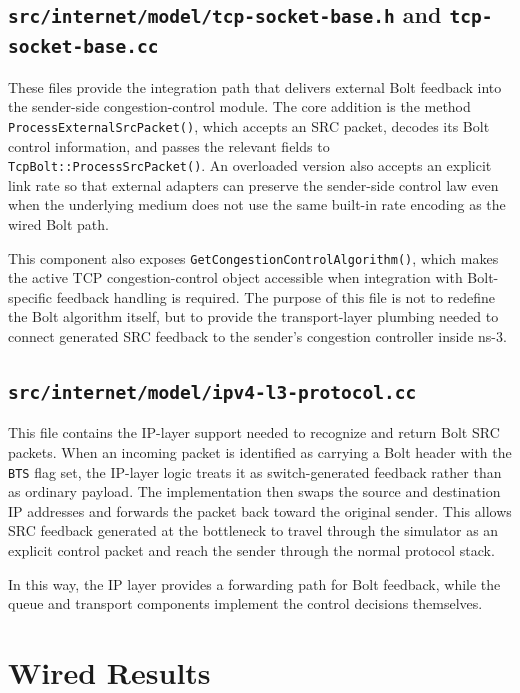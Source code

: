 \subsection{\texttt{src/internet/model/tcp-socket-base.h} and \texttt{tcp-socket-base.cc}}

These files provide the integration path that delivers external Bolt feedback into the sender-side congestion-control module. The core addition is the method \texttt{ProcessExternalSrcPacket()}, which accepts an SRC packet, decodes its Bolt control information, and passes the relevant fields to \texttt{TcpBolt::ProcessSrcPacket()}. An overloaded version also accepts an explicit link rate so that external adapters can preserve the sender-side control law even when the underlying medium does not use the same built-in rate encoding as the wired Bolt path.

This component also exposes \texttt{GetCongestionControlAlgorithm()}, which makes the active TCP congestion-control object accessible when integration with Bolt-specific feedback handling is required. The purpose of this file is not to redefine the Bolt algorithm itself, but to provide the transport-layer plumbing needed to connect generated SRC feedback to the sender's congestion controller inside ns-3.

\subsection{\texttt{src/internet/model/ipv4-l3-protocol.cc}}

This file contains the IP-layer support needed to recognize and return Bolt SRC packets. When an incoming packet is identified as carrying a Bolt header with the \texttt{BTS} flag set, the IP-layer logic treats it as switch-generated feedback rather than as ordinary payload. The implementation then swaps the source and destination IP addresses and forwards the packet back toward the original sender. This allows SRC feedback generated at the bottleneck to travel through the simulator as an explicit control packet and reach the sender through the normal protocol stack.

In this way, the IP layer provides a forwarding path for Bolt feedback, while the queue and transport components implement the control decisions themselves.

\section{Wired Results}

